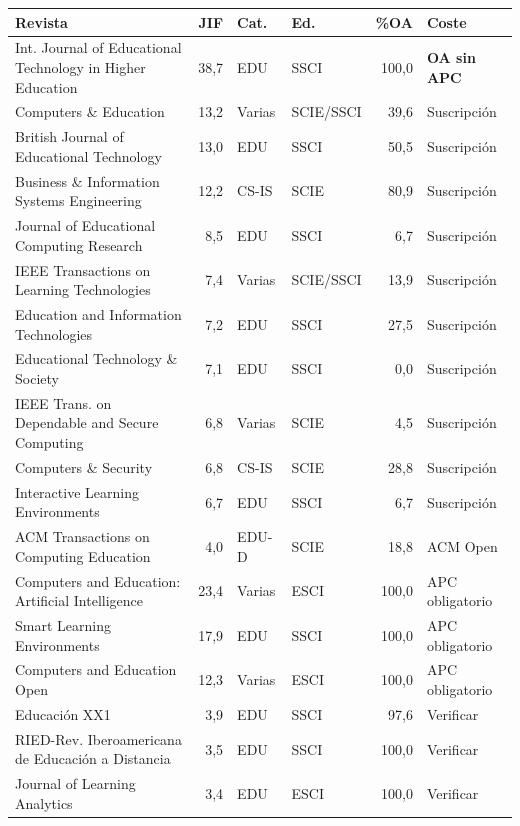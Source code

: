 \documentclass[11pt,a4paper]{article}
\begin{document}
\begin{center}
	\footnotesize
	\begin{longtable}{@{}p{6.2cm}rp{1.2cm}p{1.3cm}rp{3.4cm}@{}}
		\toprule
		\textbf{Revista} & \textbf{JIF} & \textbf{Cat.} & \textbf{Ed.} & \textbf{\%OA} & \textbf{Coste} \\
		\midrule
		\endhead
		Int. Journal of Educational Technology in Higher Education & 38,7 & EDU & SSCI & 100,0 & \textbf{OA sin APC} \\
		Computers \& Education & 13,2 & Varias & SCIE/\hspace{0pt}SSCI & 39,6 & Suscripción \\
		British Journal of Educational Technology & 13,0 & EDU & SSCI & 50,5 & Suscripción \\
		Business \& Information Systems Engineering & 12,2 & CS-IS & SCIE & 80,9 & Suscripción \\
		Journal of Educational Computing Research & 8,5 & EDU & SSCI & 6,7 & Suscripción \\
		IEEE Transactions on Learning Technologies & 7,4 & Varias & SCIE/\hspace{0pt}SSCI & 13,9 & Suscripción \\
		Education and Information Technologies & 7,2 & EDU & SSCI & 27,5 & Suscripción \\
		Educational Technology \& Society & 7,1 & EDU & SSCI & 0,0 & Suscripción \\
		IEEE Trans. on Dependable and Secure Computing & 6,8 & Varias & SCIE & 4,5 & Suscripción \\
		Computers \& Security & 6,8 & CS-IS & SCIE & 28,8 & Suscripción \\
		Interactive Learning Environments & 6,7 & EDU & SSCI & 6,7 & Suscripción \\
		ACM Transactions on Computing Education & 4,0 & EDU-D & SCIE & 18,8 & ACM Open \\
		\addlinespace
		Computers and Education: Artificial Intelligence & 23,4 & Varias & ESCI & 100,0 & APC obligatorio \\
		Smart Learning Environments & 17,9 & EDU & SSCI & 100,0 & APC obligatorio \\
		Computers and Education Open & 12,3 & Varias & ESCI & 100,0 & APC obligatorio \\
		Educación XX1 & 3,9 & EDU & SSCI & 97,6 & Verificar \\
		RIED-Rev. Iberoamericana de Educación a Distancia & 3,5 & EDU & SSCI & 100,0 & Verificar \\
		Journal of Learning Analytics & 3,4 & EDU & ESCI & 100,0 & Verificar \\
		\bottomrule
	\end{longtable}
\end{center}
\end{document}
